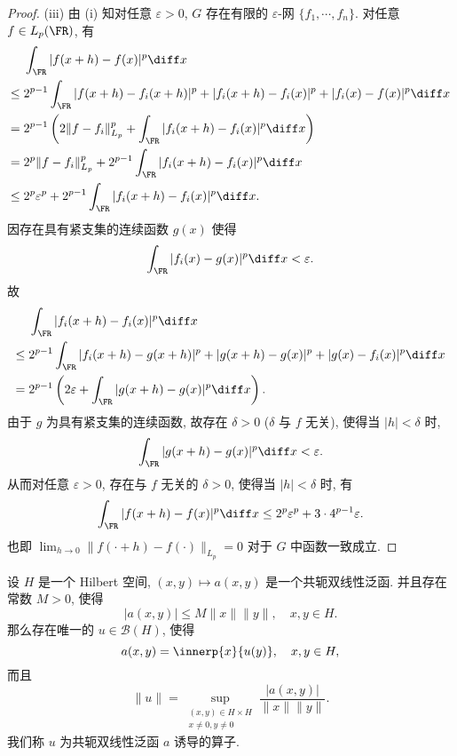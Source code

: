 \documentclass{mathexercise}
\begin{document}
\begin{proof}
    (iii) 由 (i) 知对任意 $\varepsilon>0$, $G$ 存在有限的 $\varepsilon$-网 $\{f_1,\cdots,f_n\}$.
    对任意 $f\in L_p(\FR)$, 有
    \begin{align*}
        & \int_{\FR} |f(x+h)-f(x)|^p\diff x \\
    \leq{}& 2^{p-1}\int_{\FR} |f(x+h)-f_i(x+h)|^p+|f_i(x+h)-f_i(x)|^p+|f_i(x)-f(x)|^p \diff x \\
    ={} & 2^{p-1}\left(2\|f-f_i\|_{L_p}^p+\int_{\FR} |f_i(x+h)-f_i(x)|^p\diff x\right) \\
    ={} & 2^p\|f-f_i\|_{L_p}^p+2^{p-1}\int_{\FR} |f_i(x+h)-f_i(x)|^p \diff x \\
    \leq{}& 2^p\varepsilon^p+2^{p-1}\int_{\FR} |f_i(x+h)-f_i(x)|^p \diff x.
    \end{align*}
    因存在具有紧支集的连续函数 $g(x)$ 使得
    \[\int_{\FR} |f_i(x)-g(x)|^p \diff x<\varepsilon.\]
    故
    \begin{align*}
        & \int_{\FR} |f_i(x+h)-f_i(x)|^p \diff x \\
    \leq{}& 2^{p-1}\int_{\FR} |f_i(x+h)-g(x+h)|^p+|g(x+h)-g(x)|^p+|g(x)-f_i(x)|^p \diff x \\
    ={} & 2^{p-1}\left(2\varepsilon+\int_{\FR}|g(x+h)-g(x)|^p\diff x\right).
    \end{align*}
    由于 $g$ 为具有紧支集的连续函数, 故存在 $\delta>0$ ($\delta$ 与 $f$ 无关), 使得当 $|h|<\delta$ 时,
    \[\int_{\FR}|g(x+h)-g(x)|^p\diff x<\varepsilon.\]
    从而对任意 $\varepsilon>0$, 存在与 $f$ 无关的 $\delta>0$, 使得当 $|h|<\delta$ 时, 有
    \[\int_{\FR} |f(x+h)-f(x)|^p \diff x\leq 2^p\varepsilon^p+3\cdot 4^{p-1}\varepsilon.\]
    也即 $\lim_{h\to 0}\|f(\cdot+h)-f(\cdot)\|_{L_p}=0$ 对于 $G$ 中函数一致成立.
\end{proof}



\begin{exercise}
    设 $H$ 是一个 Hilbert 空间, $(x,y)\mapsto a(x,y)$ 是一个共轭双线性泛函. 并且存在常数 $M>0$,
    使得
    \[|a(x,y)|\leq M\|x\|\|y\|,\quad x,y\in H.\]
    那么存在唯一的 $u\in\mathcal{B}(H)$, 使得
    \[a(x,y)=\innerp{x}{u(y)},\quad x,y\in H,\]
    而且
    \[\|u\|=\sup_{\substack{(x,y)\in H\times H \\ x\neq 0,y\neq 0}}\frac{|a(x,y)|}{\|x\|\|y\|}.\]
    我们称 $u$ 为共轭双线性泛函 $a$ 诱导的算子.
\end{exercise}
\end{document}
